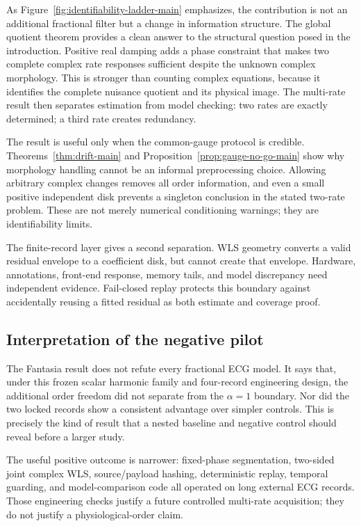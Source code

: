 \documentclass[11pt]{article}
\theoremstyle{definition}
\theoremstyle{remark}
\begin{document}
As Figure~\ref{fig:identifiability-ladder-main} emphasizes, the contribution
is not an additional fractional filter but a change in information structure.
The global quotient theorem provides a clean answer to the structural
question posed in the introduction.  Positive real damping adds a phase
constraint that makes two complete complex rate responses sufficient despite
the unknown complex morphology.  This is stronger than counting complex
equations, because it identifies the complete nuisance quotient and its
physical image.  The multi-rate result then separates estimation from model
checking: two rates are exactly determined; a third rate creates redundancy.

The result is useful only when the common-gauge protocol is credible.
Theorems~\ref{thm:drift-main} and Proposition~\ref{prop:gauge-no-go-main} show
why morphology handling cannot be an informal preprocessing choice.  Allowing
arbitrary complex changes removes all order information, and even a small
positive independent disk prevents a singleton conclusion in the stated
two-rate problem.  These are not merely numerical conditioning warnings; they
are identifiability limits.

The finite-record layer gives a second separation.  WLS geometry converts a
valid residual envelope to a coefficient disk, but cannot create that
envelope.  Hardware, annotations, front-end response, memory tails, and model
discrepancy need independent evidence.  Fail-closed replay protects this
boundary against accidentally reusing a fitted residual as both estimate and
coverage proof.

\subsection{Interpretation of the negative pilot}

The Fantasia result does not refute every fractional ECG model.  It says that,
under this frozen scalar harmonic family and four-record engineering design,
the additional order freedom did not separate from the $\alpha=1$ boundary.
Nor did the two locked records show a consistent advantage over simpler
controls.  This is precisely the kind of result that a nested baseline and
negative control should reveal before a larger study.

The useful positive outcome is narrower: fixed-phase segmentation, two-sided
joint complex WLS, source/payload hashing, deterministic replay, temporal
guarding, and model-comparison code all operated on long external ECG records.
Those engineering checks justify a future controlled multi-rate acquisition;
they do not justify a physiological-order claim.
\end{document}
